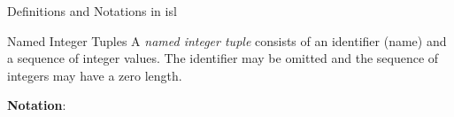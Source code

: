 \begin{frame}{Definitions and Notations in isl}
\begin{block}{Named Integer Tuples}
A \textit{named integer tuple} consists of an identifier (name) and a sequence of integer values.
The identifier may be omitted and the sequence of integers may have a zero length.
\end{block}

\item \textbf{Notation}:

\end{frame}
